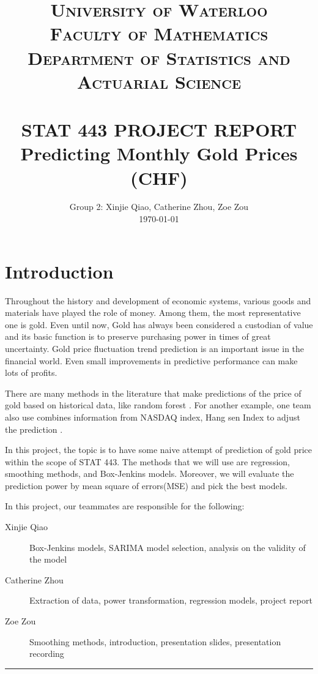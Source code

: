 \documentclass[paper=letter, fontsize=11pt]{scrartcl}
\title{
		\usefont{OT1}{bch}{b}{n}
		\normalfont \normalsize \textsc{{\Large University of Waterloo} \\[0.1cm] 
        Faculty of Mathematics \\[0.1cm] 
        Department of Statistics and Actuarial Science}
  \\ [25pt]
		\horrule{0.5pt} \\[0.4cm]
    		{\huge STAT 443 PROJECT REPORT} \\ [0.3cm]
         {\Large Predicting Monthly Gold Prices (CHF)}
		\horrule{2pt} \\[0.5cm]
}
\author{
		\normalfont 								\normalsize
        Group 2: Xinjie Qiao, Catherine Zhou, Zoe Zou \\[-3pt]		\normalsize
        \today
}
\date{}
\begin{document}
\maketitle
\thispagestyle{empty}

\tableofcontents
\listoftables
\listoffigures


\newpage
\section{Introduction}

Throughout the history and development of economic systems, various goods and materials have
played the role of money. Among them, the most representative one is gold. Even until now, Gold has always been considered a custodian of value and its basic function is to preserve purchasing power in times of great uncertainty. Gold price fluctuation trend prediction is an important issue in the financial world. Even small improvements in predictive performance can make lots of profits.

There are many methods in the literature that make predictions of the price of gold based on
historical data, like random forest \cite{GoldPrice}. For another example, one team also use combines information from NASDAQ index, Hang sen Index to adjust the prediction \cite{PredictionOfGoldPrice}. 


In this project, the topic is to have some naive attempt of prediction of gold price within the scope of STAT 443. The methods that we will use are regression, smoothing methods, and Box-Jenkins models. Moreover, we will evaluate the prediction power by mean square of errors(MSE) and pick the best models.

\vspace{0.2cm}

In this project, our teammates are responsible for the following:

\begin{description}
    \item [Xinjie Qiao] Box-Jenkins models, SARIMA model selection, analysis on the validity of the model
    \item [Catherine Zhou] Extraction of data, power transformation, regression models, project report
    \item [Zoe Zou] Smoothing methods, introduction, presentation slides, presentation recording
\end{description}

\vspace{1cm}
\begin{center}
    \noindent\rule{10cm}{0.4pt}
\end{center}
\end{document}
